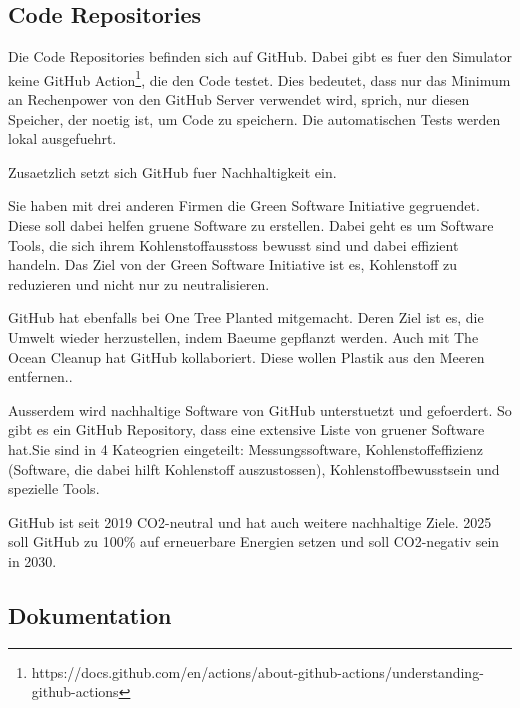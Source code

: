 \subsection{Code Repositories}

Die Code Repositories befinden sich auf GitHub. Dabei gibt es fuer den Simulator keine GitHub Action\footnote{https://docs.github.com/en/actions/about-github-actions/understanding-github-actions}, die den Code testet. Dies bedeutet, dass nur das Minimum an Rechenpower von den GitHub Server verwendet wird, sprich, nur diesen Speicher, der noetig ist, um Code zu speichern. Die automatischen Tests werden lokal ausgefuehrt.

Zusaetzlich setzt sich GitHub fuer Nachhaltigkeit ein.\cite{github-sustainability}

Sie haben mit drei anderen Firmen die Green Software Initiative gegruendet. Diese soll dabei helfen gruene Software zu erstellen.  Dabei geht es um Software Tools, die sich ihrem Kohlenstoffausstoss bewusst sind und dabei effizient handeln. Das Ziel von der Green Software Initiative ist es, Kohlenstoff zu reduzieren und nicht nur zu neutralisieren.\cite{green-software-initiative}

GitHub hat ebenfalls bei One Tree Planted mitgemacht. Deren Ziel ist es, die Umwelt wieder herzustellen, indem Baeume gepflanzt werden\cite{one-tree-planted}. Auch mit The Ocean Cleanup hat GitHub kollaboriert. Diese wollen Plastik aus den Meeren entfernen.\cite{ocean-cleanup}.

Ausserdem wird nachhaltige Software von GitHub unterstuetzt und gefoerdert. So gibt es ein GitHub Repository, dass eine extensive Liste von gruener Software hat.Sie sind in 4 Kateogrien eingeteilt: Messungssoftware, Kohlenstoffeffizienz (Software, die dabei hilft Kohlenstoff auszustossen), Kohlenstoffbewusstsein und spezielle Tools. \cite{green-software}

GitHub ist seit 2019 CO2-neutral und hat auch weitere nachhaltige Ziele. 2025 soll GitHub zu 100\% auf erneuerbare Energien setzen und soll CO2-negativ sein in 2030.\cite{github-goals}







\subsection{Dokumentation}

